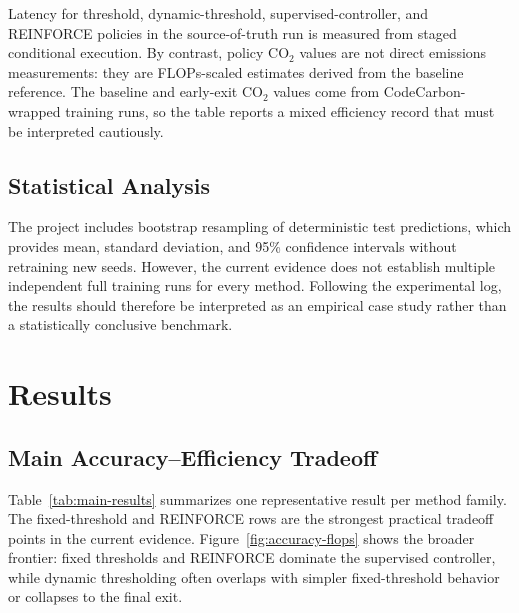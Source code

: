 \documentclass[10pt,twocolumn]{article}
\begin{document}
Latency for threshold, dynamic-threshold, supervised-controller, and REINFORCE policies in the source-of-truth run is measured from staged conditional execution. By contrast, policy CO$_2$ values are not direct emissions measurements: they are FLOPs-scaled estimates derived from the baseline reference. The baseline and early-exit CO$_2$ values come from CodeCarbon-wrapped training runs, so the table reports a mixed efficiency record that must be interpreted cautiously.

\subsection{Statistical Analysis}

The project includes bootstrap resampling of deterministic test predictions, which provides mean, standard deviation, and 95\% confidence intervals without retraining new seeds. However, the current evidence does not establish multiple independent full training runs for every method. Following the experimental log, the results should therefore be interpreted as an empirical case study rather than a statistically conclusive benchmark.

\section{Results}

\subsection{Main Accuracy--Efficiency Tradeoff}

Table~\ref{tab:main-results} summarizes one representative result per method family. The fixed-threshold and REINFORCE rows are the strongest practical tradeoff points in the current evidence. Figure~\ref{fig:accuracy-flops} shows the broader frontier: fixed thresholds and REINFORCE dominate the supervised controller, while dynamic thresholding often overlaps with simpler fixed-threshold behavior or collapses to the final exit.
\end{document}
